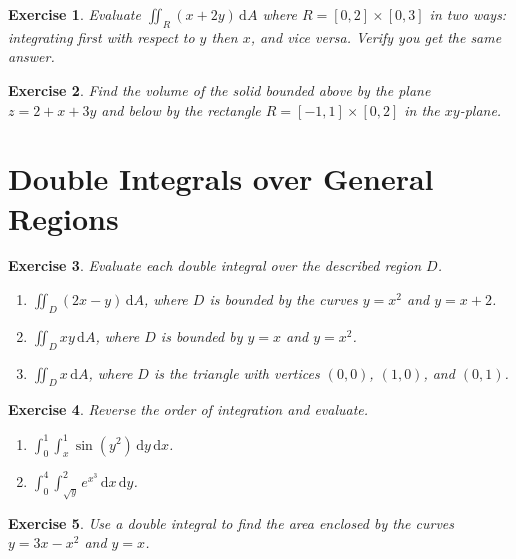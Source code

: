 \documentclass[12pt,a4paper]{article}
\theoremstyle{exercise}
\newtheorem{exercise}{Exercise}[section]
\theoremstyle{hint}
\newcommand{\dd}{\,\mathrm{d}}
\begin{document}
\begin{exercise}
Evaluate $\displaystyle\iint_{R}(x+2y)\dd A$ where
$R=[0,2]\times[0,3]$ in two ways: integrating first with respect to $y$
then $x$, and vice versa.  Verify you get the same answer.
\end{exercise}

\begin{exercise}
Find the volume of the solid bounded above by the plane
$z=2+x+3y$ and below by the rectangle
$R=[-1,1]\times[0,2]$ in the $xy$-plane.
\end{exercise}

\section{Double Integrals over General Regions}

\begin{exercise}
Evaluate each double integral over the described region $D$.
\begin{enumerate}[label=(\alph*)]
  \item $\displaystyle\iint_{D}(2x-y)\dd A$, where $D$ is bounded by the
        curves $y=x^{2}$ and $y=x+2$.
  \item $\displaystyle\iint_{D}xy\dd A$, where $D$ is bounded by
        $y=x$ and $y=x^{2}$.
  \item $\displaystyle\iint_{D}x\dd A$, where $D$ is the triangle with
        vertices $(0,0)$, $(1,0)$, and $(0,1)$.
\end{enumerate}
\end{exercise}

\begin{exercise}
Reverse the order of integration and evaluate.
\begin{enumerate}[label=(\alph*)]
  \item $\displaystyle\int_{0}^{1}\int_{x}^{1}\sin(y^{2})\dd y\dd x$.
  \item $\displaystyle\int_{0}^{4}\int_{\sqrt{y}}^{2}
          e^{x^{3}}\dd x\dd y$.
\end{enumerate}
\end{exercise}

\begin{exercise}
Use a double integral to find the area enclosed by the curves
$y=3x-x^{2}$ and $y=x$.
\end{exercise}

\end{document}
